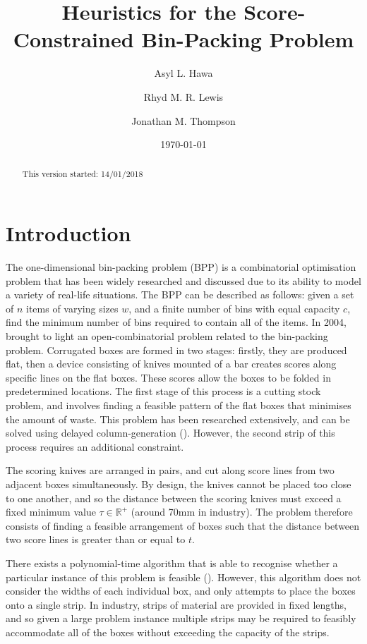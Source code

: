 \documentclass[oribibl]{llncs}
\title{Heuristics for the Score-Constrained Bin-Packing Problem}
\author{Asyl L. Hawa \and Rhyd M. R. Lewis \and Jonathan M. Thompson}
\institute{School of Mathematics, Cardiff University, Senghennydd Road, Cardiff, UK, CF24 4AG}
\date{\today}
\begin{document}
\maketitle

\begin{abstract}
	This version started: 14/01/2018
\end{abstract}

\section{Introduction}
\label{sec:intro}

The one-dimensional bin-packing problem (BPP) is a combinatorial optimisation problem that has been widely researched and discussed due to its ability to model a variety of real-life situations. The BPP can be described as follows: given a set of $n$ items of varying sizes $w$, and a finite number of bins with equal capacity $c$, find the minimum number of bins required to contain all of the items. In 2004, \citeauthor{goulimis2004} brought to light an open-combinatorial problem related to the bin-packing problem. Corrugated boxes are formed in two stages: firstly, they are produced flat, then a device consisting of knives mounted of a bar creates scores along specific lines on the flat boxes. These scores allow the boxes to be folded in predetermined locations. The first stage of this process is a cutting stock problem, and involves finding a feasible pattern of the flat boxes that minimises the amount of waste. This problem has been researched extensively, and can be solved using delayed column-generation (\citealp{gilmore1961, gilmore1963}). However, the second strip of this process requires an additional constraint.

The scoring knives are arranged in pairs, and cut along score lines from two adjacent boxes simultaneously. By design, the knives cannot be placed too close to one another, and so the distance between the scoring knives must exceed a fixed minimum value $\tau \in \mathbb{R}^{+}$ (around 70mm in industry). The problem therefore consists of finding a feasible arrangement of boxes such that the distance between two score lines is greater than or equal to $t$.

There exists a polynomial-time algorithm that is able to recognise whether a particular instance of this problem is feasible (\citealp{becker2010}). However, this algorithm does not consider the widths of each individual box, and only attempts to place the boxes onto a single strip. In industry, strips of material are provided in fixed lengths, and so given a large problem instance multiple strips may be required to feasibly accommodate all of the boxes without exceeding the capacity of the strips.  
\end{document}
